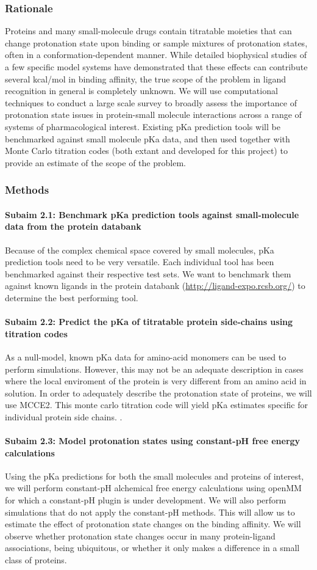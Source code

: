 \documentclass[10pt]{article}
\newcommand{\subsubsubsection}[1]{\paragraph*{#1}}
\begin{document}
\subsubsection*{Rationale}
Proteins and many small-molecule drugs contain titratable moieties that can change protonation state upon binding or sample mixtures of protonation states, often in a conformation-dependent manner. 
While detailed biophysical studies of a few specific model systems have demonstrated that these effects can contribute several kcal/mol in binding affinity, the true scope of the problem in ligand recognition in general is completely unknown. 
We will use computational techniques to conduct a large scale survey to broadly assess the importance of protonation state issues in protein-small molecule interactions across a range of systems of pharmacological interest. 
Existing pKa prediction tools will be benchmarked against small molecule pKa data, and then used together with Monte Carlo titration codes (both extant and developed for this project) to provide an estimate of the scope of the problem.

\subsubsection*{Methods}
\subsubsubsection{Subaim 2.1: Benchmark pKa prediction tools against small-molecule data from the protein databank}
Because of the complex chemical space covered by small molecules, pKa prediction tools need to be very versatile. Each individual tool has been benchmarked against their respective test sets. We want to benchmark them against known ligands in the protein databank \cite{Berman2000a,Feng2004a}(\url{http://ligand-expo.rcsb.org/}) to determine the best performing tool.

\subsubsubsection{Subaim 2.2: Predict the pKa of titratable protein side-chains using titration codes}
As a null-model, known pKa data for amino-acid monomers can be used to perform simulations. However, this may not be an adequate description in cases where the local enviroment of the protein is very different from an amino acid in solution. In order to adequately describe the protonation state of proteins, we will use MCCE2\cite{Song2009a}. This monte carlo titration code will yield pKa estimates specific for individual protein side chains.
.


\subsubsubsection{Subaim 2.3: Model protonation states using constant-pH free energy calculations}
Using the pKa predictions for both the small molecules and proteins of interest, we will perform constant-pH alchemical free energy calculations\cite{Mongan2004a} using openMM\cite{Eastman2013a} for which a constant-pH plugin is under development. We will also perform simulations that do not apply the constant-pH methods. This will allow us to estimate the effect of protonation state changes on the binding affinity. We will observe whether protonation state changes occur in many protein-ligand associations, being ubiquitous, or whether it only makes a difference in a small class of proteins.
\end{document}
